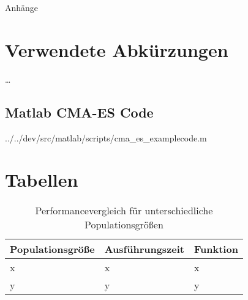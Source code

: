 ﻿%
%
%
%

\begin{appendix}
\newpage
\huge{Anhänge}
\normalsize
\thispagestyle{plain}
\section{Verwendete Abkürzungen}
\dots{}

\newpage
\begin{landscape}
\thispagestyle{plain}
\section{Matlab CMA-ES Code}
\label{lst:cmaes-mat-code}


		{../../dev/src/matlab/scripts/cma_es_examplecode.m}

\end{landscape}

\newpage
\thispagestyle{plain}
\section{Tabellen}
  \label{tbl:population-compare}

    \begin{table}[h]
      \centering

    \begin{tabular}{lll}
	\hline
	\textbf{Populationsgröße} & \textbf{Ausführungszeit} & \textbf{Funktion}\\\hline
	x & x & x \\
	y & y & y \\

      \end{tabular}
    \caption{Performancevergleich für unterschiedliche Populationsgrößen}
    \end{table}

\end{appendix}
